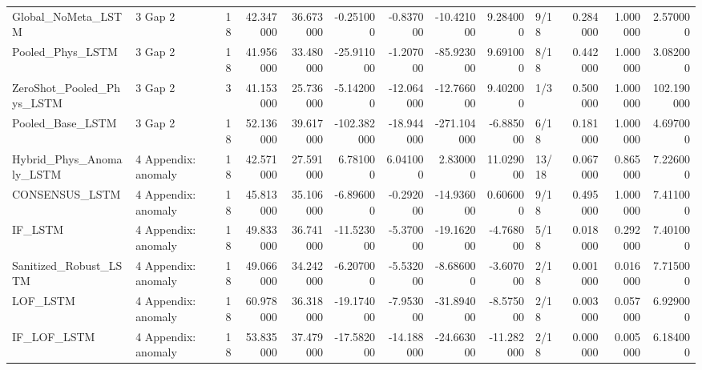 \begin{tabular}{llrrrrrrrlrrr}
Global_NoMeta_LSTM & 3 Gap 2 & 18 & 42.347000 & 36.673000 & -0.251000 & -0.837000 & -10.421000 & 9.284000 & 9/18 & 0.284000 & 1.000000 & 2.570000 \\
Pooled_Phys_LSTM & 3 Gap 2 & 18 & 41.956000 & 33.480000 & -25.911000 & -1.207000 & -85.923000 & 9.691000 & 8/18 & 0.442000 & 1.000000 & 3.082000 \\
ZeroShot_Pooled_Phys_LSTM & 3 Gap 2 & 3 & 41.153000 & 25.736000 & -5.142000 & -12.064000 & -12.766000 & 9.402000 & 1/3 & 0.500000 & 1.000000 & 102.190000 \\
Pooled_Base_LSTM & 3 Gap 2 & 18 & 52.136000 & 39.617000 & -102.382000 & -18.944000 & -271.104000 & -6.885000 & 6/18 & 0.181000 & 1.000000 & 4.697000 \\
Hybrid_Phys_Anomaly_LSTM & 4 Appendix: anomaly & 18 & 42.571000 & 27.591000 & 6.781000 & 6.041000 & 2.830000 & 11.029000 & 13/18 & 0.067000 & 0.865000 & 7.226000 \\
CONSENSUS_LSTM & 4 Appendix: anomaly & 18 & 45.813000 & 35.106000 & -6.896000 & -0.292000 & -14.936000 & 0.606000 & 9/18 & 0.495000 & 1.000000 & 7.411000 \\
IF_LSTM & 4 Appendix: anomaly & 18 & 49.833000 & 36.741000 & -11.523000 & -5.370000 & -19.162000 & -4.768000 & 5/18 & 0.018000 & 0.292000 & 7.401000 \\
Sanitized_Robust_LSTM & 4 Appendix: anomaly & 18 & 49.066000 & 34.242000 & -6.207000 & -5.532000 & -8.686000 & -3.607000 & 2/18 & 0.001000 & 0.016000 & 7.715000 \\
LOF_LSTM & 4 Appendix: anomaly & 18 & 60.978000 & 36.318000 & -19.174000 & -7.953000 & -31.894000 & -8.575000 & 2/18 & 0.003000 & 0.057000 & 6.929000 \\
IF_LOF_LSTM & 4 Appendix: anomaly & 18 & 53.835000 & 37.479000 & -17.582000 & -14.188000 & -24.663000 & -11.282000 & 2/18 & 0.000000 & 0.005000 & 6.184000 \\
\bottomrule
\end{tabular}
